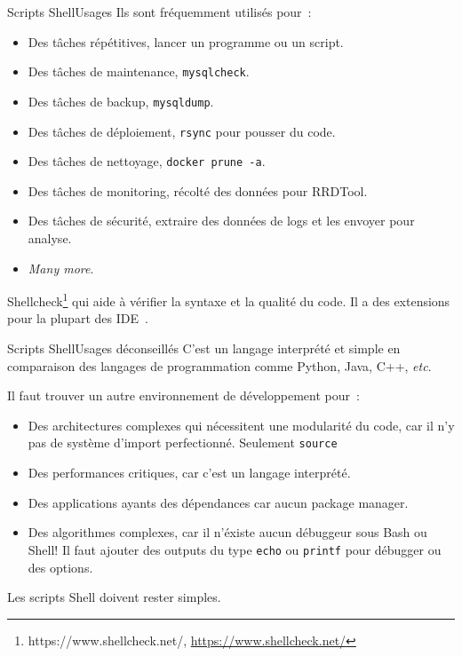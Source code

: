 \documentclass{beamer}
\begin{document}
    \begin{frame}{Scripts Shell}{Usages}
        Ils sont fréquemment utilisés pour~:
        \begin{itemize}
            \item Des tâches répétitives, lancer un programme ou un script.
            \item Des tâches de maintenance, \lstinline{mysqlcheck}.
            \item Des tâches de backup, \lstinline{mysqldump}.
            \item Des tâches de déploiement, \lstinline{rsync} pour pousser du code.
            \item Des tâches de nettoyage, \lstinline{docker prune -a}.
            \item Des tâches de monitoring, récolté des données pour RRDTool.
            \item Des tâches de sécurité, extraire des données de logs et les envoyer pour analyse.
            \item \textit{Many more}.
        \end{itemize}
        Shellcheck\footnote{https://www.shellcheck.net/, \url{https://www.shellcheck.net/}} qui aide à vérifier la syntaxe et la qualité du code.
        Il a des extensions pour la plupart des IDE~.
    \end{frame}

    \begin{frame}{Scripts Shell}{Usages déconseillés}
        C'est un langage interprété et simple en comparaison des langages de programmation comme Python, Java, C++, \textit{etc}.

        Il faut trouver un autre environnement de développement pour~:
        \begin{itemize}
            \item Des architectures complexes qui nécessitent une modularité du code, car il n'y pas de système d'import perfectionné.
            Seulement \lstinline{source}
            \item Des performances critiques, car c'est un langage interprété.
            \item Des applications ayants des dépendances car aucun package manager.
            \item Des algorithmes complexes, car il n'éxiste aucun débuggeur sous Bash ou Shell!
            Il faut ajouter des outputs du type \lstinline{echo} ou \lstinline{printf} pour débugger ou des options.
        \end{itemize}
        \bigbreak
        Les scripts Shell doivent rester simples.
    \end{frame}
\end{document}

